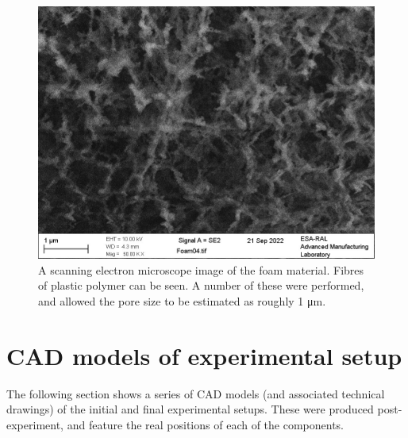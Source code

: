 \begin{figure}[ht]
\begin{centering}
\includegraphics[width=1.0\textwidth]{figures/AppendixExperiment/FoamSEM.jpg}%
\caption{\label{fig:Appx-Foam04} A scanning electron microscope image of the foam material. Fibres of plastic polymer can be seen. A number of these were performed, and allowed the pore size to be estimated as roughly 1 \unit{\micro\meter}.}
\end{centering}
\end{figure}

\section{CAD models of experimental setup}

The following section shows a series of CAD models (and associated technical drawings) of the initial and final experimental setups. These were produced post-experiment, and feature the real positions of each of the components.

